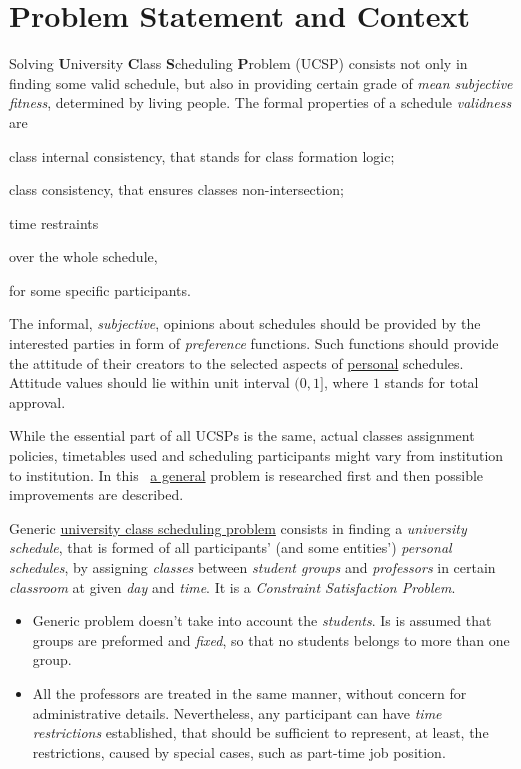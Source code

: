 \documentclass[header]{subfiles}
\begin{document}
\section{Problem Statement and Context}
Solving \textbf{U}niversity \textbf{C}lass \textbf{S}cheduling \textbf{P}roblem (UCSP)
consists not only in finding some valid schedule, but also in providing certain
grade of \emph{mean subjective fitness}, determined by living people.
The formal properties of a schedule \emph{validness} are
\begin{enumerate*}[1)]
  \item class internal consistency, that stands for class formation logic;
  \item class consistency, that ensures classes non-intersection;
  \item time restraints
    \begin{enumerate*}[(a)]
      \item over the whole schedule,
      \item for some specific participants.
    \end{enumerate*}
\end{enumerate*}
The informal, \emph{subjective}, opinions about schedules should be provided by
the interested parties in form of \emph{preference} functions. Such functions
should provide the attitude of their creators to the selected aspects of
\underline{personal} schedules. Attitude values should lie within unit interval
$(0,1]$, where $1$ stands for total approval.

While the essential part of all UCSPs is the same, actual classes assignment
policies, timetables used and scheduling participants might vary from institution
to institution. In this \thisdoc\ \underline{a general} problem is researched
first and then possible improvements are described.

\bigskip
Generic \underline{university class scheduling problem} consists in finding a
\emph{university schedule}, that is formed of all participants' (and some entities')
\emph{personal schedules}, by assigning \emph{classes} between \emph{student groups}
and \emph{professors} in certain \emph{classroom} at given \emph{day} and
\emph{time}. It is a \emph{Constraint Satisfaction Problem}.

\begin{itemize}
  \item Generic problem doesn't take into account the \emph{students}.
        Is is assumed that groups are preformed and \emph{fixed}, so that
        no students belongs to more than one group.
  \item All the professors are treated in the same manner, without concern for
        administrative details. Nevertheless, any participant can have
        \emph{time restrictions} established, that should be sufficient to
        represent, at least, the restrictions, caused by special cases,
        such as part-time job position.
\end{itemize}
\end{document}
